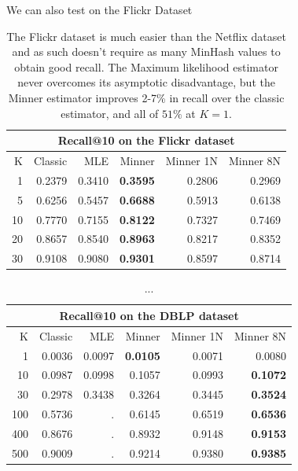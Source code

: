 We can also test on the Flickr Dataset
\begin{table}
\centering
 \begin{tabular}{|r| r r r r r|} 
 \hline
     \multicolumn{6}{|c|}{Recall@10 on the Flickr dataset} \\
 \hline
 K  & Classic & MLE & Minner & Minner 1N & Minner 8N \\
 \hline
    1 & 0.2379 & 0.3410 & \textbf{ 0.3595} & 0.2806 & 0.2969 \\
   5 & 0.6256 & 0.5457 & \textbf{ 0.6688} & 0.5913 & 0.6138 \\
  10 & 0.7770 & 0.7155 & \textbf{ 0.8122} & 0.7327 & 0.7469 \\
  20 & 0.8657 & 0.8540 & \textbf{ 0.8963} & 0.8217 & 0.8352 \\
  30 & 0.9108 & 0.9080 & \textbf{ 0.9301} & 0.8597 & 0.8714 \\
  \hline
 \end{tabular}
 \caption{The Flickr dataset is much easier than the Netflix dataset and as such doesn't require as many MinHash values to obtain good recall. The Maximum likelihood estimator never overcomes its asymptotic disadvantage, but the Minner estimator improves 2-7\% in recall over the classic estimator, and all of $51\%$ at $K=1$.}
 \label{tab:flickr}
\end{table}


\begin{table}
\centering
 \begin{tabular}{|r| r r r r r|} 
 \hline
     \multicolumn{6}{|c|}{Recall@10 on the DBLP dataset} \\
 \hline
 K  & Classic & MLE & Minner & Minner 1N & Minner 8N \\
 \hline
    1 & 0.0036 & 0.0097 & \textbf{ 0.0105} & 0.0071 & 0.0080 \\
  10 & 0.0987 & 0.0998 & 0.1057 & 0.0993 & \textbf{ 0.1072} \\
  30 & 0.2978 & 0.3438 & 0.3264 & 0.3445 & \textbf{ 0.3524} \\
 100 & 0.5736 &      . & 0.6145 & 0.6519 & \textbf{ 0.6536} \\
 400 & 0.8676 &      . & 0.8932 & 0.9148 & \textbf{ 0.9153} \\
 500 & 0.9009 &      . & 0.9214 & 0.9380 & \textbf{ 0.9385} \\
  \hline
 \end{tabular}
 \caption{...}
 \label{tab:dblp}
\end{table}

